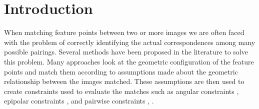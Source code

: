 \documentclass[12pt,journal]{IEEEtran}
\begin{document}
\section{Introduction}
%
When matching feature points between two or more images we are often 
faced with the problem of correctly identifying the actual 
correspondences among many possible pairings. Several methods have been 
proposed in the literature to solve this problem. Many approaches look 
at the geometric configuration of the feature points and match them 
according to assumptions made about the geometric relationship between 
the images matched. These assumptions are then used to create 
constraints used to evaluate the matches such as angular constraints 
\cite{kim2008efficient}, epipolar constraints \cite{torr2000mlesac}, 
\cite{chum2005matching} and pairwise constraints \cite{choi2009robust}, 
\cite{leordeanu2005spectral}.
%
\end{document}
